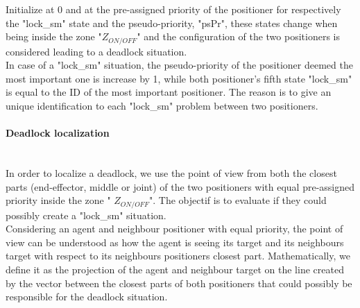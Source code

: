 \documentclass[]{spie}  %
\begin{document}
	Initialize at 0 and at the pre-assigned priority of the positioner for respectively the "lock\_sm" state and the pseudo-priority, "psPr",  these states change when being inside the zone "$Z_{ON/OFF}$" and the configuration of the two positioners is considered leading to a deadlock situation. \\
	In case of a "lock\_sm" situation, the pseudo-priority of the positioner deemed the most important one is increase by 1, while both positioner's fifth state "lock\_sm" is equal to the ID of the most important positioner. The reason is to give an unique identification to each  "lock\_sm" problem between two positioners.
	
	

	\paragraph{Deadlock localization}\mbox{}\\
	In order to localize a deadlock, we use the point of view from both the closest parts (end-effector, middle or joint) of the two positioners with equal pre-assigned priority inside the zone " $Z_{ON/OFF}$". The objectif is to evaluate if they could possibly create a  "lock\_sm"  situation.\\
	Considering an agent and neighbour positioner with equal priority, the point of view can be understood as how the agent is seeing its target and its neighbours target with respect to its neighbours positioners closest part. 
	Mathematically, we define it as the projection of the agent and neighbour target on the line created by the vector between the closest parts of both positioners that could possibly be responsible for the deadlock situation.\\
	
\end{document}
